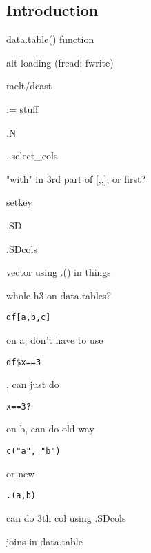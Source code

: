 
\subsection{Introduction}

data.table() function

alt loading (fread; fwrite)

melt/dcast

:= stuff

.N

..select_cols

"with" in 3rd part of [,,], or first?

setkey

.SD

.SDcols

vector using .() in things

whole h3 on data.tables?

\begin{verbatim}
df[a,b,c]
\end{verbatim}

on a, don't have to use 
\begin{verbatim}
df$x==3
\end{verbatim}
, can just do 
\begin{verbatim}
x==3?
\end{verbatim}

on b, can do old way

\begin{verbatim}
c("a", "b")
\end{verbatim}
or new
\begin{verbatim}
.(a,b)
\end{verbatim}
can do 3th col using .SDcols



joins in data.table

